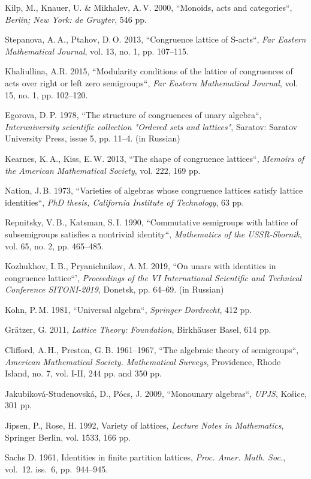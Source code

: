 \documentclass[11pt,twoside,final
]{article}
\begin{document}
\begin{engbibliography}{99}

	Kilp, M., Knauer, U. \& Mikhalev, A.\,V. 2000, ``Monoids, acts and categories``, \textit{Berlin; New York: de Gruyter}, 546 pp.

	Stepanova, A.\,A., Ptahov, D.\,O.  2013, ``Congruence lattice of S-acts``, \textit{Far Eastern Mathematical Journal}, vol. 13, no. 1, pp. 107--115.

	Khaliullina, A.R. 2015, ``Modularity conditions of the lattice of congruences of acts over right or left zero semigroups``, \textit{Far Eastern Mathematical Journal}, vol. 15, no. 1, pp. 102--120.

	Egorova, D.\,P. 1978, ``The structure of congruences of unary algebra``, \textit{Interuniversity scientific collection "Ordered sets and lattices"}, Saratov: Saratov University Press, issue 5, pp. 11--4. (in Russian)

	Kearnes, K.\,A., Kiss, E.\,W. 2013, ``The shape of congruence lattices``, \textit{Memoirs of the American Mathematical Society}, vol. 222, 169 pp.

	Nation, J.\,B. 1973, ``Varieties of algebras whose congruence lattices satisfy lattice identities``, \textit{PhD thesis, California Institute of Technology}, 63 pp.

	Repnitsky, V.\,B., Katsman, S.\,I. 1990, ``Commutative semigroups with lattice of subsemigroups satisfies a nontrivial identity``, \textit{Mathematics of the USSR-Sbornik}, vol. 65, no. 2, pp. 465--485.

	Kozhukhov, I.\,B., Pryanichnikov, A.\,M. 2019, ``On unars with identities in congruence lattice``', \textit{Proceedings of the VI International Scientific and Technical Conference SITONI-2019}, Donetsk, pp. 64--69. (in Russian)

	Kohn, P.\,M. 1981, ``Universal algebra``, \textit{Springer Dordrecht}, 412 pp.

	Grätzer, G. 2011, \textit{Lattice Theory: Foundation}, Birkhäuser Basel, 614 pp.

	Clifford, A.\,H., Preston, G.\,B. 1961--1967, ``The algebraic theory of semigroups``, \textit{American Mathematical Society. Mathematical Surveys}, Providence, Rhode Island, no. 7, vol. I-II, 244 pp. and 350 pp.

	Jakubiková-Studenovská, D., Pócs, J. 2009, ``Monounary algebras``, \textit{UPJS}, Košice, 301 pp.

	Jipsen, P., Rose, H. 1992, Variety of lattices, \textit{Lecture Notes in Mathematics}, Springer Berlin, vol. 1533, 166 pp.

	Sachs D. 1961, Identities in finite partition lattices, \textit{Proc. Amer. Math. Soc.}, vol.~12. iss.~6, pp.~944--945.

\end{engbibliography}

\label{end}
\end{document}
